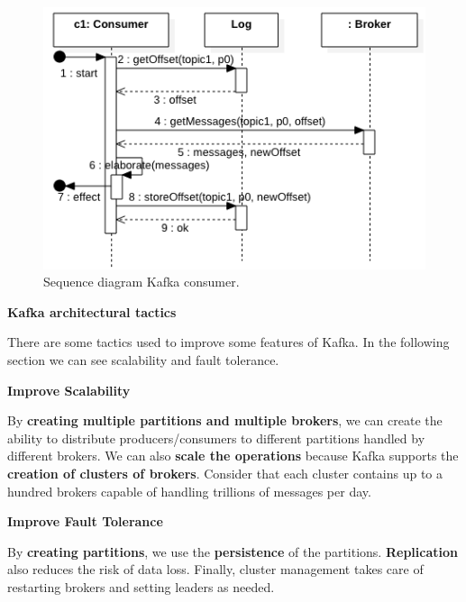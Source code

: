 \begin{figure}[!htp]
    \centering
    \includegraphics[width=.8\textwidth]{img/kafka-consumer.png}
    \caption{Sequence diagram Kafka consumer.}
\end{figure}

\begin{center}
    \large
    \textcolor{Red2}{\textbf{Kafka architectural tactics}}
\end{center}
There are some tactics used to improve some features of Kafka. In the following section we can see scalability and fault tolerance.

\begin{flushleft}
    \textcolor{Red2}{\textbf{Improve Scalability}}
\end{flushleft}
By \textbf{creating multiple partitions and multiple brokers}, we can create the ability to distribute producers/consumers to different partitions handled by different brokers. We can also \textbf{scale the operations} because Kafka supports the \textbf{creation of clusters of brokers}. Consider that each cluster contains up to a hundred brokers capable of handling trillions of messages per day.

\begin{flushleft}
    \textcolor{Red2}{\textbf{Improve Fault Tolerance}}
\end{flushleft}
By \textbf{creating partitions}, we use the \textbf{persistence} of the partitions. \textbf{Replication} also reduces the risk of data loss. Finally, cluster management takes care of restarting brokers and setting leaders as needed.